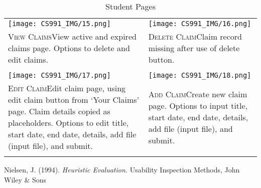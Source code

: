 \documentclass[11pt, english]{article}
\begin{document}
	\begin{center}
                \scriptsize
        \begin{longtable}{p{7cm}p{7cm}}
		\texttt{[image: CS991\_IMG/15.png]} & \texttt{[image: CS991\_IMG/16.png]}\\
		\textsc{View Claims}\newline View active and expired claims page. Options to delete and edit claims. & \textsc{Delete Claim}\newline Claim record missing after use of delete button.\\
		& \\
		\texttt{[image: CS991\_IMG/17.png]} & \texttt{[image: CS991\_IMG/18.png]}\\
		 \textsc{Edit Claim}\newline Edit claim page, using edit claim button from `Your Claims' page. Claim details copied as placeholders. Options to edit title, start date, end date, details, add file (input file), and submit. & \textsc{Add Claim}\newline Create new claim page. Options to input title, start date, end date, details, add file (input file), and submit.\\
                \caption{Student Pages}
        \end{longtable}
        \end{center}

\renewcommand\refname{Bibliography}

\begin{thebibliography}{9}

                Nielsen, J. (1994).
                \textsl{Heuristic Evaluation.}
		Usability Inspection Methods, John Wiley \& Sons

\end{thebibliography}
\end{document}
